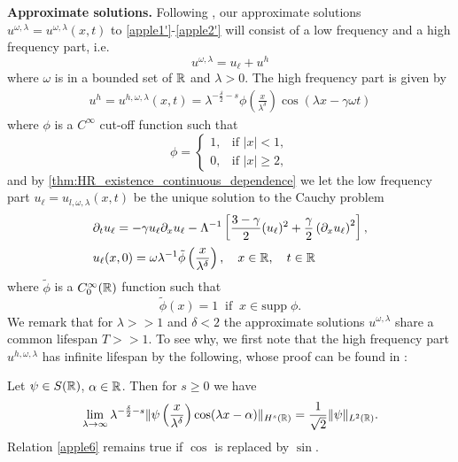 \textbf{Approximate solutions.}
Following \cite{Himonas:2009fk}, our approximate solutions
\\ $u^{\omega, \lambda} = u^{\omega,
\lambda}(x,t)$ to \eqref{apple1'}-\eqref{apple2'} will
consist of a low frequency and a high frequency part,
i.e.
%
%
%
%
\begin{equation}
\label{apple1}
u^{\omega,\lambda} = u_\ell + u^h
\end{equation}
%
%
%
%
where $\omega$ is in a bounded set of $\mathbb{R}$ and $\lambda > 0$. The high frequency part is given by 
%
%
%
%
\begin{equation}
\begin{split}
u^h = u^{h,\omega,\lambda}(x,t) =
\lambda^{-\frac{\delta}{2} -s}
\phi \left (\frac{x}{\lambda^\delta}\right )
\cos(\lambda x - \gamma \omega t)
\end{split}
\end{equation}
%
%
%
%
where $\phi$ is a $C^\infty$ cut-off function such that
%
%
%
%
\begin{equation*}
\phi = \begin{cases}
1, &\text{if $|x|<1$,} \\
0, &\text{if $|x| \ge 2,$} \end{cases}
\end{equation*}
%
%
%
%
and by \cref{thm:HR_existence_continuous_dependence} 
we let the low frequency part $u_\ell = u_{l,
\omega, \lambda}(x,t)$ be the unique solution to the Cauchy problem
%
%
\begin{align}
\label{u-l-apple1'}
& \partial_t u_\ell = -\gamma u_\ell \partial_x u_\ell -
\Lambda^{-1} \left[ \frac{3-\gamma}{2}(u_\ell)^2 +
\frac{\gamma}{2} \left( \partial_x u_\ell \right)^2
\right],
\\
& u_\ell(x,0) = \omega \lambda^{-1} \tilde{\phi} \left(
\frac{x}{\lambda^{\delta}}
\right), \quad x \in \mathbb{R}, \quad t \in \mathbb{R}
\label{apple1ah}
\end{align}
%
%
%
%
where $\tilde{\phi}$ is a $C^{\infty}_0(\mathbb{R})$ function such that
%
%
%
%
\begin{equation}
\label{apple1ah7}
\tilde{\phi}(x) = 1 \; \;  \text{if} \; \;
x \in \text{supp} \; \phi.
\end{equation}
%
%
%
%
We remark that for $\lambda >>1$ and $\delta < 2$ the approximate solutions 
$u^{\omega, \lambda}$ share a common lifespan $T >> 1$. To see why, we 
first note that the high frequency part $u^{h, \omega, \lambda}$ has 
infinite lifespan by the following, whose 
proof can be found in \cite{Himonas:2009fk}: 
%
%
\begin{lemma}
\label{applea}
Let $\psi \in S(\mathbb{R})$, $\alpha \in \mathbb{R}$. Then for $s \ge 0$ we have
%
%
\begin{equation}
\begin{split}
\lim_{\lambda \to \infty} \lambda^{-\frac{\delta}{2}-s}
\|\psi \left( \frac{x}{\lambda^\delta} \right)\cos(\lambda
x - \alpha) \|_{H^s(\mathbb{R})} = \frac{1}{\sqrt
2}\|\psi\|_{L^2(\mathbb{R})}.
\label{apple6}
\end{split}
\end{equation}
%
%
Relation \eqref{apple6} remains true if $\cos$ is
replaced by $\sin$.
\end{lemma}
